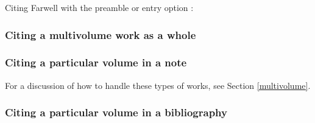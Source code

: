 \documentclass[11pt,letterpaper,oneside]{article}
\begin{document}
\begin{citebib}
\item \cite[p. 67, 3C12]{farwell1997}
\item \cite{tauber1958}
\end{citebib}

\noindent Citing Farwell with the preamble or entry option
:

\begin{citebib}
\item \cite[p. 67, 3C12]{farwell1997}
\end{citebib}

\setcounter{subsubsection}{116}
\subsubsection{Citing a multivolume work as a whole}
\label{14.117}

\begin{citebib}
\item \cite{aristotle1983}
\item \cite{byrne1981}
\item \cite{james1962}
\end{citebib}

\subsubsection{Citing a particular volume in a note}
\label{14.118}

For a discussion of how to handle these types of works, see Section
\ref{multivolume}.

\begin{citebib}
\item \cite[4:243]{byrne1981}
\item \cite*[32--33]{james1963.5}
\item \cite[4:245]{byrne1981}
\item \cite*[34]{james1963.5}
\end{citebib}

\subsubsection{Citing a particular volume in a bibliography}
\label{14.119}
\end{document}
